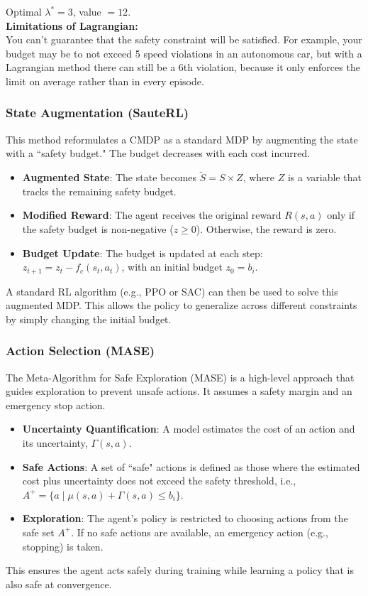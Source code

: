 \documentclass[12pt]{article}
\begin{document}
Optimal $\lambda^* = 3$, value $=12$. \\ 

\textbf{Limitations of Lagrangian:} \\ 
You can't guarantee that the safety constraint will be satisfied. For example, your budget may be to not exceed 5 speed violations in an autonomous car, but with a Lagrangian method there can still be a 6th violation, because it only enforces the limit on average rather than in every episode.
\subsubsection{State Augmentation (SauteRL)}
This method reformulates a CMDP as a standard MDP by augmenting the state with a ``safety budget." The budget decreases with each cost incurred.
\begin{itemize}
    \item \textbf{Augmented State}: The state becomes $\tilde{S} = S \times Z$, where $Z$ is a variable that tracks the remaining safety budget.
    \item \textbf{Modified Reward}: The agent receives the original reward $R(s, a)$ only if the safety budget is non-negative ($z \geq 0$). Otherwise, the reward is zero.
    \item \textbf{Budget Update}: The budget is updated at each step: $z_{t+1} = z_t - f_c(s_t, a_t)$, with an initial budget $z_0 = b_i$.
\end{itemize}
A standard RL algorithm (e.g., PPO or SAC) can then be used to solve this augmented MDP. This allows the policy to generalize across different constraints by simply changing the initial budget.

\subsubsection{Action Selection (MASE)}
The Meta-Algorithm for Safe Exploration (MASE) is a high-level approach that guides exploration to prevent unsafe actions. It assumes a safety margin and an emergency stop action.
\begin{itemize}
    \item \textbf{Uncertainty Quantification}: A model estimates the cost of an action and its uncertainty, $\Gamma(s, a)$.
    \item \textbf{Safe Actions}: A set of ``safe" actions is defined as those where the estimated cost plus uncertainty does not exceed the safety threshold, i.e., $A^+ = \{a \mid \mu(s, a) + \Gamma(s, a) \leq b_i\}$.
    \item \textbf{Exploration}: The agent's policy is restricted to choosing actions from the safe set $A^+$. If no safe actions are available, an emergency action (e.g., stopping) is taken.
\end{itemize}
This ensures the agent acts safely during training while learning a policy that is also safe at convergence.  
\end{document}
